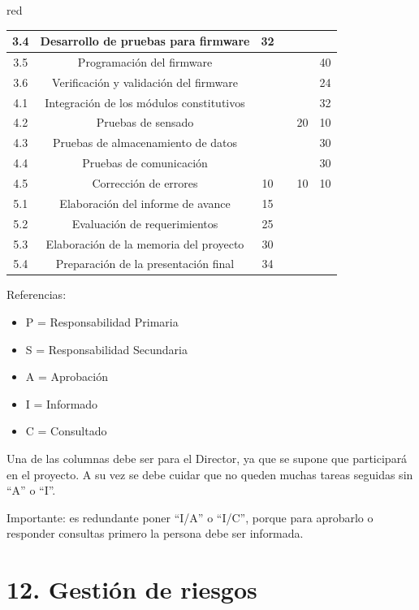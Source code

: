 \documentclass[11pt]{charter}
\begin{document}
\begin{consigna}{red}
\begin{table}[htpb]
{\begin{tabular}{|c|c|c|c|c|c|}
3.4 & Desarrollo de pruebas para firmware & 32 &  &  &  \\ \hline
3.5 & Programación del firmware &  &  &  & 40 \\ \hline
3.6 & Verificación y validación del firmware &  &  &  & 24 \\ \hline
4.1 & Integración de los módulos constitutivos &  &  &  & 32 \\ \hline
4.2 & Pruebas de sensado &  &  & 20 & 10 \\ \hline
4.3 & Pruebas de almacenamiento de datos&  &  &  & 30 \\ \hline
4.4 & Pruebas de comunicación &  &  &  & 30 \\ \hline
4.5 & Corrección de errores & 10 &  & 10 & 10 \\ \hline
5.1 & Elaboración del informe de avance& 15 &  &  &  \\ \hline
5.2 & Evaluación de requerimientos & 25 &  &  &  \\ \hline
5.3 & Elaboración de la memoria del proyecto & 30 &  &  &  \\ \hline
5.4 & Preparación de la presentación final & 34 &  &  &  \\ \hline\end{tabular}%
}
\end{table}

{\footnotesize
Referencias:
\begin{itemize}
	\item P = Responsabilidad Primaria
	\item S = Responsabilidad Secundaria
	\item A = Aprobación
	\item I = Informado
	\item C = Consultado
\end{itemize}
} %

Una de las columnas debe ser para el Director, ya que se supone que participará en el proyecto.
A su vez se debe cuidar que no queden muchas tareas seguidas sin ``A'' o ``I''.

Importante: es redundante poner ``I/A'' o ``I/C'', porque para aprobarlo o responder consultas primero la persona debe ser informada.

\end{consigna}

\section{12. Gestión de riesgos}
\label{sec:riesgos}
\end{document}
